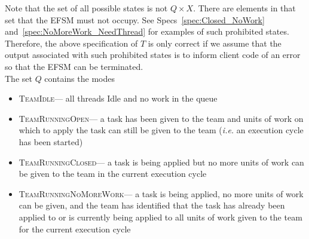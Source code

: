 \documentclass{article}
\newcommand{\TeamIdle}          {\textsc{TeamIdle}}
\newcommand{\TeamRunningOpen}   {\textsc{TeamRunningOpen}}
\newcommand{\TeamRunningClosed} {\textsc{TeamRunningClosed}}
\newcommand{\TeamRunningNoMoreWork} {\textsc{TeamRunningNoMoreWork}}
\newcommand{\TeamTerminating}   {\textsc{TeamTerminating}}
\begin{document}
Note that the set of all possible states is not $Q \times X$.  There are
elements in that set that the EFSM must not occupy.  See
Specs~\ref{spec:Closed_NoWork} and~\ref{spec:NoMoreWork_NeedThread} for examples
of such prohibited states.  Therefore, the above specification of $T$ is only
correct if we assume that the output associated with such prohibited states is
to inform client code of an error so that the EFSM can be terminated.\\

The set $Q$ contains the modes
\begin{itemize}
\item{\TeamIdle --- all threads Idle and no work in the queue}
\item{\TeamRunningOpen --- a task has been given to the team and units of work
on which to apply the task can still be given to the team (\textit{i.e.} an
execution cycle has been started)}
\item{\TeamRunningClosed --- a task is being applied but no more units
of work can be given to the team in the current execution cycle}
\item{\TeamRunningNoMoreWork --- a task is being applied, no more
units of work can be given, and the team has identified that the task has
already been applied to or is currently being applied to all units of work given
to the team for the current execution cycle}
\end{itemize}
\end{document}

